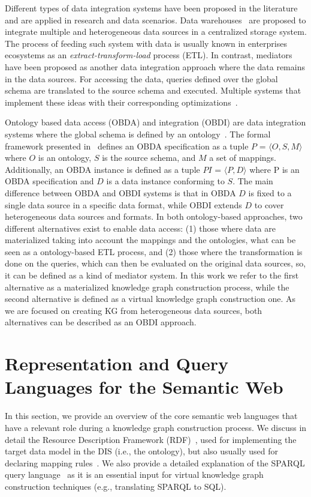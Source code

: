 Different types of data integration systems have been proposed in the literature and are applied in research and data scenarios. Data warehouses~\citep{vassiliadis2009survey} are proposed to integrate multiple and heterogeneous data sources in a centralized storage system. The process of feeding such system with data is usually known in enterprises ecosystems as an \textit{extract-transform-load} process (ETL). In contrast, mediators~\citep{wiederhold1992mediators} have been proposed as another data integration approach where the data remains in the data sources. For accessing the data, queries defined over the global schema are translated to the source schema and executed. Multiple systems that implement these ideas with their corresponding optimizations~\citep{tsimmis1994,rajaraman1996querying,roth1997don}.

Ontology based data access (OBDA) and integration (OBDI) are data integration systems where the global schema is defined by an ontology~\citep{poggi2008linking}. The formal framework presented in~\citep{xiao2018obdasurvey} defines an OBDA specification as a tuple $P$ = $\langle O,S,M\rangle$ where $O$ is an ontology, $S$ is the source schema, and $M$ a set of mappings. Additionally, an OBDA instance is defined as a tuple $PI$ = $\langle P,D\rangle$ where P is an OBDA specification and $D$ is a data instance conforming to $S$. The main difference between OBDA and OBDI systems is that in OBDA $D$ is fixed to a single data source in a specific data format, while OBDI extends $D$ to cover heterogeneous data sources and formats. In both ontology-based approaches, two different alternatives exist to enable data access: (1) those where data are materialized taking into account the mappings and the ontologies, what can be seen as a ontology-based ETL process, and (2) those where the transformation is done on the queries, which can then be evaluated on the original data sources, so, it can be defined as a kind of mediator system. In this work we refer to the first alternative as a materialized knowledge graph construction process, while the second alternative is defined as a virtual knowledge graph construction one. As we are focused on creating KG from heterogeneous data sources, both alternatives can be described as an OBDI approach.

\section{Representation and Query Languages for the Semantic Web}
\label{sec:soa_representation}
In this section, we provide an overview of the core semantic web languages that have a relevant role during a knowledge graph construction process. We discuss in detail the Resource Description Framework (RDF)~\citep{RDF}, used for implementing the target data model in the DIS (i.e., the ontology), but also usually used for declaring mapping rules~\citep{R2RML,dimou2014rml,michel2015translation}. We also provide a detailed explanation of the SPARQL query language~\citep{SPARQL} as it is an essential input for virtual knowledge graph construction techniques (e.g., translating SPARQL to SQL).

